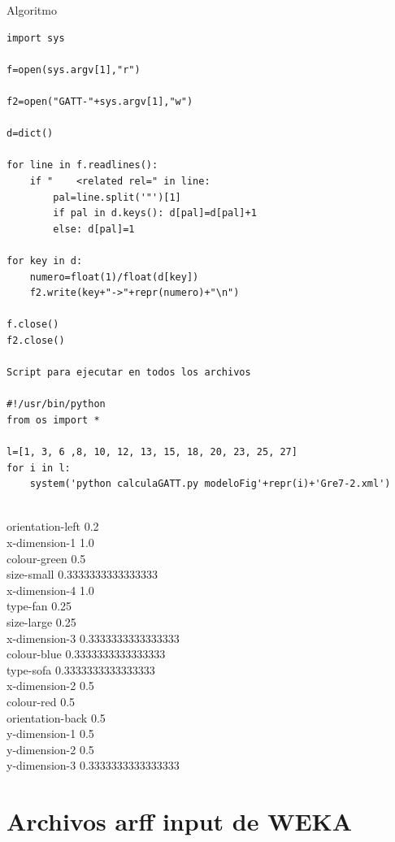 Algoritmo\\
\label{algoritmo-GATT}
\begin{verbatim}
import sys

f=open(sys.argv[1],"r")

f2=open("GATT-"+sys.argv[1],"w")

d=dict()

for line in f.readlines():
    if "    <related rel=" in line:
        pal=line.split('"')[1]
        if pal in d.keys(): d[pal]=d[pal]+1
        else: d[pal]=1

for key in d:
    numero=float(1)/float(d[key])
    f2.write(key+"->"+repr(numero)+"\n")

f.close()
f2.close()

Script para ejecutar en todos los archivos

#!/usr/bin/python
from os import *

l=[1, 3, 6 ,8, 10, 12, 13, 15, 18, 20, 23, 25, 27]
for i in l:
    system('python calculaGATT.py modeloFig'+repr(i)+'Gre7-2.xml')


\end{verbatim}




\label{probabilidad-GATT}

orientation-left	0.2\\
x-dimension-1	1.0\\
colour-green	0.5\\
size-small	0.3333333333333333\\
x-dimension-4	1.0\\
type-fan	0.25\\
size-large	0.25\\
x-dimension-3	0.3333333333333333\\
colour-blue	0.3333333333333333\\
type-sofa	0.3333333333333333\\
x-dimension-2	0.5\\
colour-red	0.5\\
orientation-back	0.5\\
y-dimension-1	0.5\\
y-dimension-2	0.5\\
y-dimension-3	0.3333333333333333\\

\chapter{Archivos arff input de WEKA}
\label{archivos-arff-blue}

